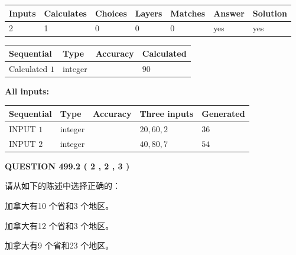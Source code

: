 \documentclass{ctexart}
\begin{document}
   
\noindent\begin{tabular}{|l|l|l|l|l|l|l|}
 \hline
Inputs & Calculates & Choices & Layers & Matches & Answer & Solution \\ \hline
 2  & 
 1  & 
 0
  & 
 0  & 
 0  & 
  yes & 
  yes 
  \\ \hline
 \end{tabular}
   
   
   
   
\noindent{}
   
   
  
  
\noindent\begin{tabular}{|l|l|l|l|}
\hline
 Sequential & Type & Accuracy & Calculated \\ 
\hline
 
 
  Calculated $  1 $ & integer &  & 
  $ 90 $ 
 \\  \hline  
 \end{tabular}
   
   
   
   
\noindent\vspace{0.1in}\hspace{-0.08in} {\textbf{\Large{All inputs: }}}
   
   
  
  
\noindent\begin{tabular}{|l|l|l|l|l|}
\hline
 Sequential & Type & Accuracy & Three inputs & Generated \\ 
\hline
 
 
  INPUT $  1 $ & integer &  & $
 20
 , 
 60
 , 
 2
 $ & $ 36 $ 
 \\  \hline  
 
 
  INPUT $  2 $ & integer &  & $
 40
 , 
 80
 , 
 7
 $ & $ 54 $ 
 \\  \hline  
 \end{tabular}
   
   
  
\vspace{0.2in}
  
{\textbf{\Large{QUESTION
499.2 
 ( 2 , 2 , 3 )
}}}
  
  
请从如下的陈述中选择正确的：
 
 
加拿大有10 个省和3 个地区。
 
 
加拿大有12 个省和3 个地区。
 
 
加拿大有9 个省和23 个地区。
 
\end{document}
